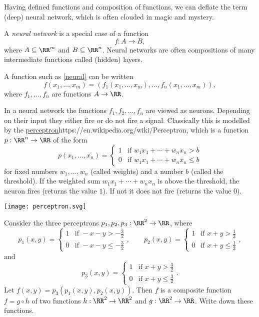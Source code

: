 \documentclass{article}
\begin{document}
Having defined functions and composition of functions, we can deflate
the term (deep) neural network, which is often clouded in
magic and mystery.

A \emph{neural network} is a special case of a function
\begin{equation}\label{neural}
f: A\rightarrow B,
\end{equation}
where $A\subseteq \RR^m$ and $B\subseteq \RR^n$. Neural networks are
often compositions of many intermediate functions called
(hidden) layers.


\begin{frameit}
A function such as \eqref{neural} can
be written
\begin{equation}\label{neuralfct}
f(x_1, \dots, x_m) = \left(
f_1(x_1, \dots, x_m), \dots, f_n(x_1, \dots, x_m)\right),
\end{equation}
where $f_1, \dots, f_n$ are functions $A\rightarrow \RR$.
\end{frameit}


In a neural
network the functions $f_1, f_2, \dots, f_n$ are viewed as neurons. Depending on their
input they either fire or do not fire a signal. Classically this is
modelled by the \url{perceptron}{https://en.wikipedia.org/wiki/Perceptron},
which is a function $p:\RR^n\rightarrow \RR$ of the form
\begin{equation}\label{relu}
p(x_1, \dots, x_n) =
\begin{cases}
  1 &\text{if } w_1 x_1 + \cdots + w_n x_n > b\\
  0 &\text{if } w_1 x_1 + \cdots + w_n x_n \leq b
\end{cases}
\end{equation}
  for fixed numbers $w_1, \dots, w_n$ (called weights) and a number $b$ (called the threshold).
  If the weighted sum $w_1 x_1 + \cdots + w_n x_n$ is above the threshold, the neuron
  fires (returns the value $1$). If not it does not fire (returns the value $0$).

\texttt{[image: perceptron.svg]}


  \beginshex\label{perceptronex}
  Consider the three perceptrons $p_1, p_2, p_3: \RR^2\rightarrow \RR$, where
  $$
p_1(x, y) =
\begin{cases}
  1 &\text{if } -x-y > -\frac{3}{2}\\
  0 &\text{if } -x-y \leq -\frac{3}{2}
\end{cases},
\qquad
p_2(x, y) =
\begin{cases}
  1 &\text{if } x + y > \frac{1}{2}\\
  0 &\text{if } x + y \leq \frac{1}{2}
\end{cases},
$$
and
$$
p_3(x, y) =
\begin{cases}
  1 &\text{if } x + y > \frac{3}{2}\\
  0 &\text{if } x + y \leq \frac{3}{2}
\end{cases}.
$$
Let $f(x, y) = p_3 (p_1(x, y), p_2(x, y))$. Then $f$ is
a composite function $f = g\circ h$ of two functions $h: \RR^2\rightarrow \RR^2$
and $g: \RR^2\rightarrow \RR$. Write down these functions.
\end{document}
